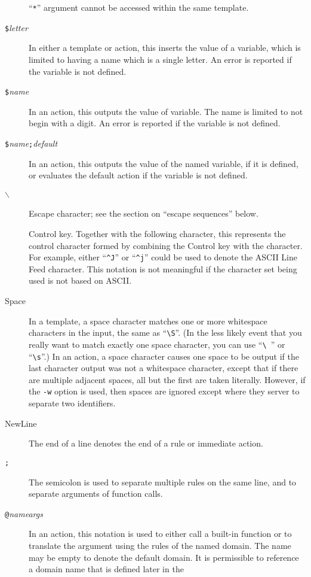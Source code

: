 \begin{description}
``\verb/*/'' argument cannot be accessed within the same template.
\item[{\tt \$}{\it letter}]
In either a template or action, this inserts the value of a variable,
which is limited to having a name which is a single letter.
An error is reported if the variable is not defined.
\item[{\tt \$\ttlb }{\it name}{\tt \ttrb }]
In an action, this outputs the value of variable.  The name is limited
to not begin with a digit.  An error is reported if the variable is not
defined.
\item[{\tt \$\ttlb }{\it name}{\tt ;}{\it default}{\tt \ttrb }]
In an action, this outputs the value of the named variable, if it is
defined, or evaluates the default action if the variable is not defined.
\item[{\tt $\backslash$ }]
Escape character; see the section on ``escape sequences'' below.
\item[\tt \ttcaret]
Control key.  Together with the following character, this represents the
control character formed by combining the Control key with the character.
For example, either ``\verb/^J/'' or ``\verb/^j/'' could be used to
denote the ASCII Line Feed character.  This notation is not meaningful if 
the character set being used is not based on ASCII.
\item[Space]
In a template, a space character matches one or more whitespace
characters in the input, the same as ``\verb|\S|''.
(In the less likely event that you really want to
match exactly one space character, you can use ``\verb/\ /'' or
``\verb/\s/''.) 
In an action, a space character causes one space to be output if the
last character output was not a whitespace character, except that if
there are multiple adjacent spaces, all but the first are taken literally.
However, if the \verb/-w/ option is used, then spaces are ignored except
where they server to separate two identifiers.
\item[NewLine]
The end of a line denotes the end of a rule or immediate action.
\item[{\tt ;}]
The semicolon is used to separate multiple rules on the same line, and
to separate arguments of function calls.
\item[{\tt @}{\it name}{\tt \ttlb }{\it args}{\tt \ttrb }]
In an action, this notation is used to either call a built-in function
or to translate the argument using the rules of the named domain.
The name may be empty to denote the default domain.
It is permissible to reference a domain name that is defined later in the

\end{description}
